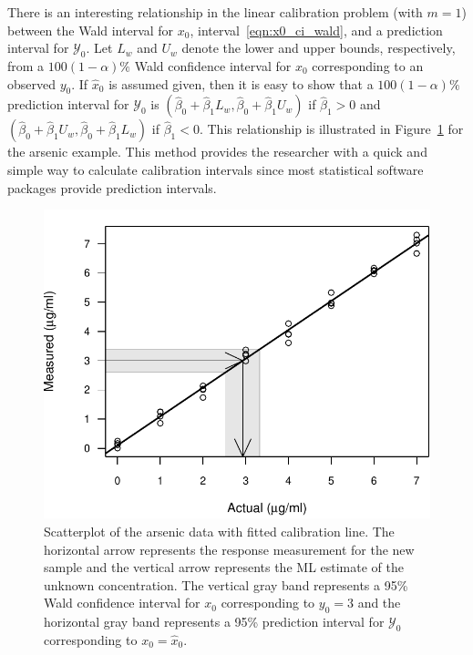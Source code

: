 \documentclass[cmfont,usenames,dvipsnames,leqno]{afit-etd}\usepackage[]{graphicx}\usepackage[]{color}
\makeatletter
\def\maxwidth{ %
  \ifdim\Gin@nat@width>\linewidth
    \linewidth
  \else
    \Gin@nat@width
  \fi
}
\newenvironment{knitrout}{}{} %
\renewenvironment{knitrout}{\begin{singlespace}}{\end{singlespace}}
\newcommand{\mc}[1]{\ensuremath{\mathcal{#1}}}
\newcommand{\wh}[1]{\ensuremath{\widehat{#1}}}
\makeatother
\begin{document}
There is an interesting relationship in the linear calibration problem (with $m = 1$) between the Wald interval for $x_0$, interval~\eqref{eqn:x0_ci_wald}, and a prediction interval for $\mc{Y}_0$. Let $L_w$ and $U_w$ denote the lower and upper bounds, respectively, from a $100(1 - \alpha)\%$ Wald confidence interval for $x_0$ corresponding to an observed $y_0$. If $\wh{x}_0$ is assumed given, then it is easy to show that a $100(1 - \alpha)\%$ prediction interval for $\mc{Y}_0$ is $(\wh{\beta}_0+\wh{\beta}_1 L_w, \wh{\beta}_0+\wh{\beta}_1 U_w)$ if $\wh{\beta}_1 > 0$ and $(\wh{\beta}_0+\wh{\beta}_1 U_w, \wh{\beta}_0+\wh{\beta}_1 L_w)$ if $\wh{\beta}_1 < 0$. This relationship is illustrated in Figure~\ref{fig:arsenic-wald} for the arsenic example. This method provides the researcher with a quick and simple way to calculate calibration intervals since most statistical software packages provide prediction intervals.

\begin{knitrout}
\color{fgcolor}\begin{figure}[H]

\includegraphics[width=\maxwidth]{figure/arsenic-wald} \caption[Relationship beween Wald interval for $x_0$ and prediction interval for $\mc{Y}_0$]{Scatterplot of the arsenic data with fitted calibration line. The horizontal arrow represents the response measurement for the new sample and the vertical arrow represents the \ac{ML} estimate of the unknown concentration. The vertical gray band represents a 95\% Wald confidence interval for $x_0$ corresponding to $y_0 = 3$ and the horizontal gray band represents a 95\% prediction interval for $\mc{Y}_0$ corresponding to $x_0 = \wh{x}_0$.\label{fig:arsenic-wald}}
\end{figure}


\end{knitrout}
\end{document}
